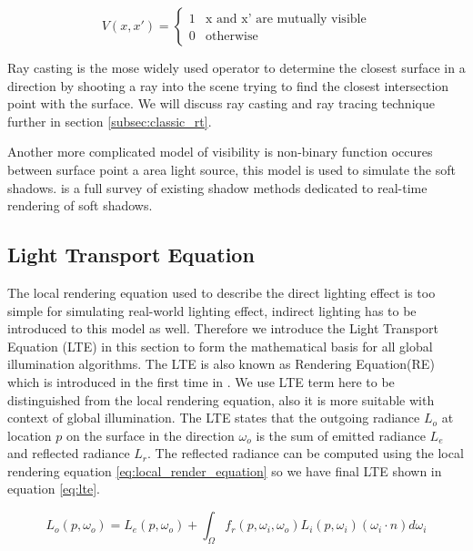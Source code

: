   \begin{equation}
    V(x, x')=\left\{
    \begin{array}{ll}
      1  & \text{x and x' are mutually visible} \\
      0  & \text{otherwise}
    \end{array}
    \right.
  \end{equation}

Ray casting is the mose widely used operator to determine the closest surface in a direction by shooting a ray into the scene trying to find the closest intersection point with the surface. We will discuss ray casting and ray tracing technique further in section \ref{subsec:classic_rt}.

Another more complicated model of visibility is non-binary function occures between surface point a area light source, this model is used to simulate the soft shadows.  \cite{Hasenfratz2003} is a full survey of existing shadow methods dedicated to real-time rendering of soft shadows. 

\subsection{Light Transport Equation} 

The local rendering equation used to describe the direct lighting effect is too simple for simulating real-world lighting effect, indirect lighting has to be introduced to this model as well. Therefore we introduce the Light Transport Equation (LTE) in this section to form the mathematical basis for all global illumination algorithms. The LTE is also known as Rendering Equation(RE) which is introduced in the first time in \cite{Kajiya:1986:RE:15922.15902}. We use LTE term here to be distinguished from the local rendering equation, also it is more suitable with context of global illumination. The LTE states that the outgoing radiance \(L_{o}\) at location \(p\) on the surface in the direction \(\omega_{o}\) is the sum of emitted radiance \(L_{e}\) and reflected radiance \(L_{r}\). The reflected radiance can be computed using the local rendering equation \ref{eq:local_render_equation} so we have final LTE shown in equation \ref{eq:lte}. 

\begin{equation}
L_{o}(p, \omega_{o}) = L_{e}(p, \omega_{o}) + \int_{\Omega}f_{r}(p, \omega_{i}, \omega_{o})L_{i}(p, \omega_{i})(\omega_{i} \cdot n)d\omega_{i}
\label{eq:lte}
\end{equation}  


